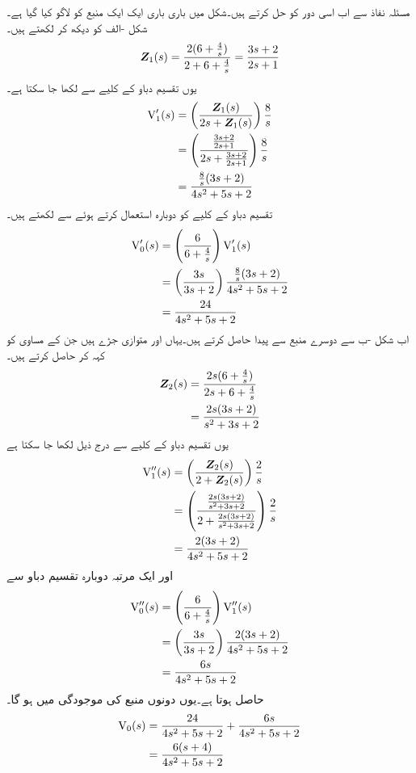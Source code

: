 مسئلہ نفاذ سے اب اسی دور کو حل کرتے ہیں۔شکل  میں باری باری ایک ایک منبع کو لاگو کیا گیا ہے۔شکل -الف کو دیکھ کر  لکھتے ہیں۔
\begin{align*}
{\ensuremath{{\boldsymbol{Z}}}}_1(s)=\frac{2(6+\frac{4}{s})}{2+6+\frac{4}{s}}=\frac{3s+2}{2s+1}
\end{align*}
یوں تقسیم دباو کے کلیے سے   لکھا جا سکتا ہے۔
\begin{align*}
{\ensuremath{{\textup{V}}}}'_1(s)&=\left(\frac{{{\boldsymbol{Z}}}_1(s)}{2s+{{\boldsymbol{Z}}}_1(s)}\right)\frac{8}{s}\\
&=\left(\frac{\frac{3s+2}{2s+1}}{2s+\frac{3s+2}{2s+1}}\right)\frac{8}{s}\\
&=\frac{\frac{8}{s}(3s+2)}{4s^2+5s+2}
\end{align*}
تقسیم دباو کے کلیے کو دوبارہ استعمال کرتے ہوئے  سے  لکھتے ہیں۔
\begin{align*}
{\ensuremath{{\textup{V}}}}'_0(s)&=\left(\frac{6}{6+\frac{4}{s}}\right){{\textup{V}}}'_1(s)\\
&=\left(\frac{3s}{3s+2}\right)\frac{\frac{8}{s}(3s+2)}{4s^2+5s+2}\\
&=\frac{24}{4s^2+5s+2}
\end{align*}
اب شکل -ب سے دوسرے منبع سے پیدا  حاصل کرتے ہیں۔یہاں  اور  متوازی جڑے ہیں جن کے مساوی کو  کہہ کر حاصل کرتے ہیں۔
\begin{align*}
{\ensuremath{{\boldsymbol{Z}}}}_2(s)&=\frac{2s(6+\frac{4}{s})}{2s+6+\frac{4}{s}}\\
&=\frac{2s(3s+2)}{s^2+3s+2}
\end{align*}
یوں تقسیم دباو کے کلیے سے درج ذیل لکھا جا سکتا ہے
\begin{align*}
{\ensuremath{{\textup{V}}}}''_1(s)&=\left(\frac{{{\boldsymbol{Z}}}_2(s)}{2+{{\boldsymbol{Z}}}_2(s)}\right)\frac{2}{s}\\
&=\left(\frac{\frac{2s(3s+2)}{s^2+3s+2}}{2+\frac{2s(3s+2)}{s^2+3s+2}}\right)\frac{2}{s}\\
&=\frac{2(3s+2)}{4s^2+5s+2}
\end{align*}
اور ایک مرتبہ دوبارہ تقسیم دباو سے 
\begin{align*}
{\ensuremath{{\textup{V}}}}''_0(s)&=\left(\frac{6}{6+\frac{4}{s}}\right){{\textup{V}}}''_1(s)\\
&=\left(\frac{3s}{3s+2}\right)\frac{2(3s+2)}{4s^2+5s+2}\\
&=\frac{6s}{4s^2+5s+2}
\end{align*}
حاصل ہوتا ہے۔یوں دونوں منبع کی موجودگی میں  ہو گا۔
\begin{align*}
{\ensuremath{{\textup{V}}}}_0(s)&=\frac{24}{4s^2+5s+2}+\frac{6s}{4s^2+5s+2}\\
&=\frac{6(s+4)}{4s^2+5s+2}
\end{align*}


